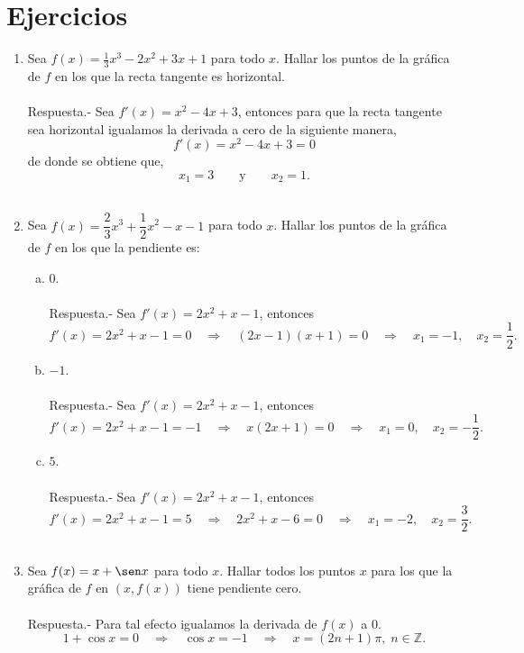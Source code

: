 \section{Ejercicios}
\begin{enumerate}[\bfseries 1.]

    \item Sea $f(x)=\frac{1}{3}x^3-2x^2+3x+1$ para todo $x$. Hallar los puntos de la gráfica de $f$ en los que la recta tangente es horizontal.\\\\
	Respuesta.-\; Sea  $f'(x)=x^2-4x+3$, entonces para que la recta tangente sea horizontal igualamos la derivada a cero de la siguiente manera,
	$$f'(x)=x^2-4x+3=0$$
	de donde se obtiene que,
	$$x_1=3\qquad \mbox{y}\qquad x_2=1.$$\\

    \item Sea $f(x)=\dfrac{2}{3}x^3+\dfrac{1}{2}x^2-x-1$ para todo $x$. Hallar los puntos de la gráfica de $f$ en los que la pendiente es:\\

	\begin{enumerate}[a)]

	    \item $0$.\\\\
		Respuesta.-\; Sea $f'(x)=2x^2+x-1$, entonces
		$$f'(x)=2x^2+x-1=0\quad \Rightarrow \quad (2x-1)(x+1)=0 \quad \Rightarrow\quad x_1=-1,\quad x_2=\dfrac{1}{2}.$$

	    \item $-1$.\\\\
		Respuesta.-\; Sea $f'(x)=2x^2+x-1$, entonces
		$$f'(x)=2x^2+x-1=-1\quad \Rightarrow \quad x(2x+1) = 0 \quad \Rightarrow \quad x_1=0,\quad x_2=-\dfrac{1}{2}.$$

	    \item $5$.\\\\
		Respuesta.-\; Sea $f'(x)=2x^2+x-1$, entonces
		$$f'(x)=2x^2+x-1=5\quad \Rightarrow \quad 2x^2+x-6=0 \quad \Rightarrow \quad x_1=-2,\quad x_2=\dfrac{3}{2}.$$\\


	\end{enumerate}

    \item Sea $f(x)=x+\sen x$ para todo $x$. Hallar todos los puntos $x$ para los que la gráfica de $f$ en $\left(x,f(x)\right)$ tiene pendiente cero.\\\\
	Respuesta.- Para tal efecto igualamos la derivada de $f(x)$ a $0$.
	$$1+\cos x = 0 \quad \Rightarrow \quad \cos x = -1 \quad \Rightarrow \quad x=(2n+1)\pi,\; n\in \mathbb{Z}.$$\\


\end{enumerate}
